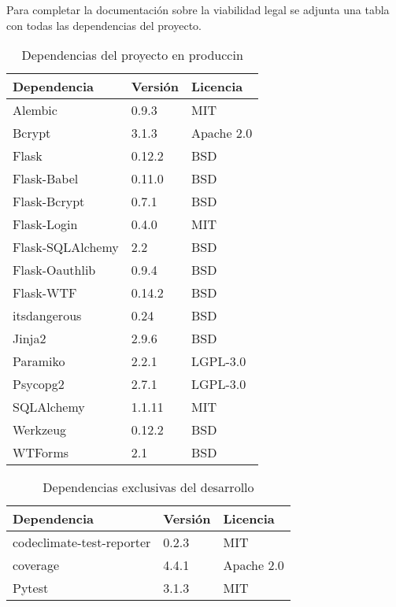 Para completar la documentación sobre la viabilidad legal se adjunta una tabla con todas las dependencias del proyecto.
\FloatBarrier
\begin{table}[]
\centering
\begin{tabular}{lll}
\hline
Dependencia & Versión & Licencia \\ \hline
Alembic & 0.9.3 & MIT \\
Bcrypt & 3.1.3 & Apache 2.0 \\
Flask & 0.12.2 & BSD \\
Flask-Babel & 0.11.0 & BSD \\
Flask-Bcrypt & 0.7.1 & BSD \\
Flask-Login & 0.4.0 & MIT \\
Flask-SQLAlchemy & 2.2 & BSD \\
Flask-Oauthlib & 0.9.4 & BSD \\
Flask-WTF & 0.14.2 & BSD \\
itsdangerous & 0.24 & BSD \\
Jinja2 & 2.9.6 & BSD \\
Paramiko & 2.2.1 & LGPL-3.0 \\
Psycopg2 & 2.7.1 & LGPL-3.0 \\
SQLAlchemy &1.1.11 & MIT \\
Werkzeug & 0.12.2 & BSD \\
WTForms & 2.1 & BSD \\ \hline
\end{tabular}
\caption{Dependencias del proyecto en produccin}
\label{Dependencias en produccin}
\end{table}


\begin{table}[]
\centering
\begin{tabular}{lll}
\hline
Dependencia & Versión & Licencia \\ \hline
codeclimate-test-reporter & 0.2.3 & MIT \\
coverage & 4.4.1 & Apache 2.0 \\ 
Pytest & 3.1.3 & MIT \\ \hline
\end{tabular}
\caption{Dependencias exclusivas del desarrollo}
\label{Dependencias exclusivas en desarrollo}
\end{table}


